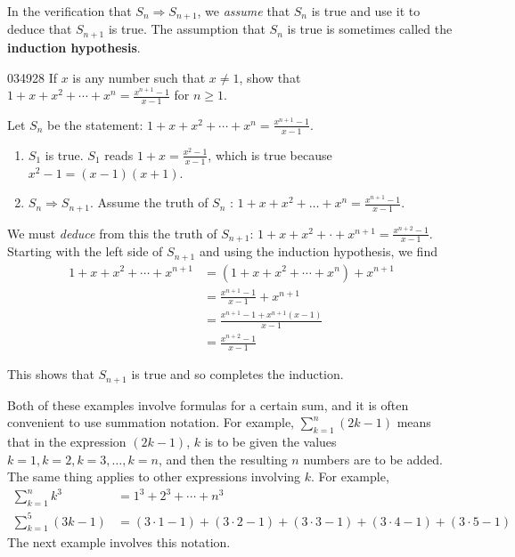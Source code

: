 In the verification that $S_{n} \Rightarrow S_{n+1}$, we \textit{assume} that $S_{n}$ is true and use it to deduce that $S_{n+1}$ is true. The assumption that $S_{n}$ is true is sometimes called the \textbf{induction hypothesis}.


\begin{example}{}{034928}
If $x$ is any number such that $x \neq 1$, show that $1 + x + x^2 + \cdots + x^n = \frac{x^{n+1}-1}{x-1}$ for $n \geq 1$.


\begin{solution}
  Let $S_{n}$ be the statement: $1 + x + x^2 + \cdots + x^n = \frac{x^{n+1}-1}{x-1}$.


\begin{enumerate}
\item $S_{1}$ is true. $S_{1}$ reads $ 1+x = \frac{x^2 -1}{x-1}$, which is true because $x^{2} - 1 = (x - 1)(x + 1)$.

\item $S_{n} \Rightarrow S_{n+1}$. Assume the truth of $S_{n}$ : $1 + x + x^{2} + \dots  + x^n = \frac{x^{n+1}-1}{x-1}$.

\end{enumerate}

We must \textit{deduce} from this the truth of $S_{n+1}$: $1 + x + x^{2} + \cdot + x^{n+1} = \frac{x^{n+2}-1}{x-1}$. Starting with the left side of $S_{n+1}$ and using the induction hypothesis, we find
\begin{align*}
1 +x + x^2 + \cdots + x^{n+1} & = (1 + x + x^2 + \cdots + x^n) + x^{n+1} \\
&= \frac{x^{n+1} -1 }{x-1} + x^{n+1} \\
&= \frac{x^{n+1} -1 + x^{n+1}(x-1)}{x-1} \\
&= \frac{x^{n+2}-1}{x-1} 
\end{align*}

This shows that $S_{n+1}$ is true and so completes the induction.
\end{solution}
\end{example}

Both of these examples involve formulas for a certain sum, and it is often convenient to use summation notation. For example, $ \sum_{k=1}^{n} (2k-1)$ means that in the expression $(2k - 1)$, $k$ is to be given the values $k = 1, k = 2, k = 3, \dots , k = n$, and then the resulting $n$ numbers are to be added. The same thing applies to other expressions involving $k$. For example,
\begin{align*}
\sum_{k=1}^{n} k^3 &=1^3 + 2^3 + \cdots + n^3 \\
 \sum_{k=1}^{5} (3k-1) &= (3 \cdot 1 -1) + (3 \cdot 2 - 1) + (3 \cdot 3 - 1) +(3 \cdot 4 - 1) + (3 \cdot 5 - 1)
\end{align*}
The next example involves this notation.


